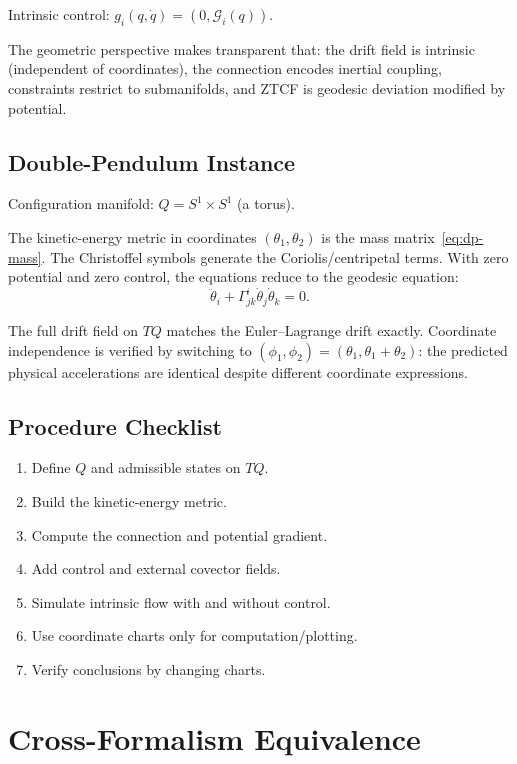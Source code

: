 \documentclass[11pt]{article}
\begin{document}
Intrinsic control: $g_i(q,\dot{q}) = (0, \mathcal{G}_i(q))$.

The geometric perspective makes transparent that:
the drift field is intrinsic (independent of coordinates),
the connection encodes inertial coupling,
constraints restrict to submanifolds,
and ZTCF is geodesic deviation modified by potential.

\subsection{Double-Pendulum Instance}

Configuration manifold: $Q = S^1\times S^1$ (a torus).

The kinetic-energy metric in coordinates $(\theta_1,\theta_2)$ is the mass matrix~\eqref{eq:dp-mass}.
The Christoffel symbols generate the Coriolis/centripetal terms.
With zero potential and zero control, the equations reduce to the geodesic equation:
\begin{equation}
\ddot\theta_i + \Gamma^i_{jk}\dot\theta_j\dot\theta_k = 0.
\end{equation}

The full drift field on $TQ$ matches the Euler--Lagrange drift exactly.
Coordinate independence is verified by switching to $(\phi_1,\phi_2)=(\theta_1,\theta_1+\theta_2)$: the predicted physical accelerations are identical despite different coordinate expressions.

\subsection{Procedure Checklist}

\begin{enumerate}
\item Define $Q$ and admissible states on $TQ$.
\item Build the kinetic-energy metric.
\item Compute the connection and potential gradient.
\item Add control and external covector fields.
\item Simulate intrinsic flow with and without control.
\item Use coordinate charts only for computation/plotting.
\item Verify conclusions by changing charts.
\end{enumerate}


\section{Cross-Formalism Equivalence}\label{sec:cross-formalism}
\end{document}
